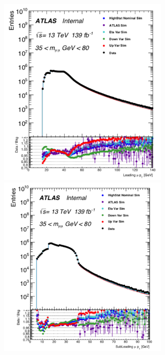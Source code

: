 \begin{figure}[!htb]
    \begin{center}
        \includegraphics[width=0.75\textwidth]{figures/chapter_dimuon/MCDataCompare}
        \includegraphics[width=0.75\textwidth]{figures/chapter_dimuon/MCDataCompare2}

\end{center}
\end{figure}
